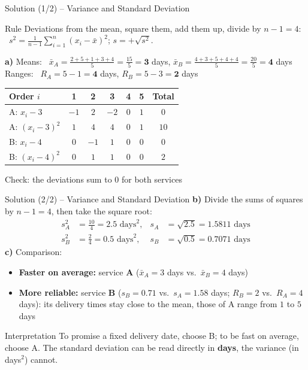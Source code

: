 \documentclass[aspectratio=169,11pt]{beamer}
\begin{document}
\begin{frame}{Solution (1/2) -- Variance and Standard Deviation}
  \begin{block}{Rule}
    Deviations from the mean, square them, add them up, divide by $n - 1 = 4$: \
    $s^2 = \frac{1}{n-1}\sum_{i=1}^{n}(x_i - \bar{x})^2$; \quad $s = +\sqrt{s^2}$.
  \end{block}
  \textbf{a)} Means: \ $\bar{x}_A = \frac{2 + 5 + 1 + 3 + 4}{5} = \frac{15}{5} = \mathbf{3}$ days, \quad
  $\bar{x}_B = \frac{4 + 3 + 5 + 4 + 4}{5} = \frac{20}{5} = \mathbf{4}$ days\\[2pt]
  \hspace*{1.2em}Ranges: \ $R_A = 5 - 1 = \mathbf{4}$ days, \quad $R_B = 5 - 3 = \mathbf{2}$ days
  \begin{center}
    \renewcommand{\arraystretch}{1.05}
    \begin{tabular}{lcccccc}
      \toprule
      Order $i$ & 1 & 2 & 3 & 4 & 5 & Total \\
      \midrule
      A: $x_i - 3$ & $-1$ & $2$ & $-2$ & $0$ & $1$ & $0$ \\
      A: $(x_i - 3)^2$ & $1$ & $4$ & $4$ & $0$ & $1$ & $10$ \\
      \midrule
      B: $x_i - 4$ & $0$ & $-1$ & $1$ & $0$ & $0$ & $0$ \\
      B: $(x_i - 4)^2$ & $0$ & $1$ & $1$ & $0$ & $0$ & $2$ \\
      \bottomrule
    \end{tabular}
  \end{center}
  Check: the deviations sum to $0$ for both services \checkmark
\end{frame}

\begin{frame}{Solution (2/2) -- Variance and Standard Deviation}
  \textbf{b)} Divide the sums of squares by $n - 1 = 4$, then take the square root:
  \begin{align*}
    s^2_A &= \frac{10}{4} = \mathbf{2.5} \text{ days}^2, & s_A &= \sqrt{2.5} = \mathbf{1.5811} \text{ days} \\[2pt]
    s^2_B &= \frac{2}{4} = \mathbf{0.5} \text{ days}^2, & s_B &= \sqrt{0.5} = \mathbf{0.7071} \text{ days}
  \end{align*}
  \textbf{c)} Comparison:
  \begin{itemize}
    \item \textbf{Faster on average:} service \textbf{A} ($\bar{x}_A = 3$ days vs.\ $\bar{x}_B = 4$ days)
    \item \textbf{More reliable:} service \textbf{B} ($s_B = 0.71$ vs.\ $s_A = 1.58$ days; $R_B = 2$ vs.\
      $R_A = 4$ days): its delivery times stay close to the mean, those of A range from $1$ to $5$ days
  \end{itemize}
  \begin{alertblock}{Interpretation}
    To promise a fixed delivery date, choose B; to be fast on average, choose A.
    The standard deviation can be read directly in \textbf{days}, the variance (in days$^2$) cannot.
  \end{alertblock}
\end{frame}
\end{document}
